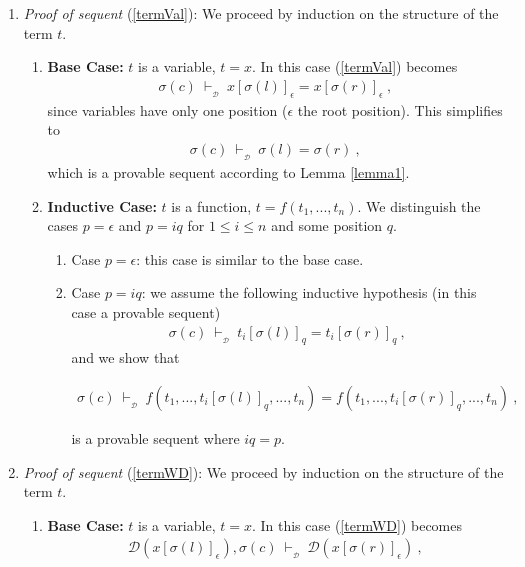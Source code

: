 \documentclass[copyright]{eptcs}
\begin{document}
\begin{enumerate}
\item \textit{Proof of sequent} (\ref{termVal}): We proceed by induction on the structure of the term $t$.
\begin{enumerate}
\item \textbf{Base Case:} $t$ is a variable, $t = x$. In this case (\ref{termVal}) becomes
\begin{eqnarray*}
\sigma(c)~\vdash_{_\mathcal{D}}~x[\sigma(l)]_\epsilon = x[\sigma(r)]_\epsilon~,
\end{eqnarray*}
since variables have only one position ($\epsilon$ the root position). This simplifies to 
\begin{eqnarray*}
\sigma(c)~\vdash_{_\mathcal{D}}~\sigma(l) = \sigma(r)~,
\end{eqnarray*}
which is a provable sequent according to Lemma \ref{lemma1}.
\item \textbf{Inductive Case:} $t$ is a function, $t = f(t_1,...,t_n)$. We distinguish the cases $p=\epsilon$ and $p=iq$ for $1\leq i\leq n$ and some position $q$.
\begin{enumerate}
\item Case $p=\epsilon$: this case is similar to the base case.
\item Case $p=iq$: we assume the following inductive hypothesis (in this case a provable sequent)
\begin{eqnarray*}
\sigma(c)~\vdash_{_\mathcal{D}}~t_i[\sigma(l)]_q = t_i[\sigma(r)]_q~,
\end{eqnarray*}
and we show that
\begin{small}
\begin{eqnarray*}
\sigma(c)~\vdash_{_\mathcal{D}}~f(t_1,...,t_i[\sigma(l)]_q,...,t_n) = f(t_1,...,t_i[\sigma(r)]_q,...,t_n)~,
\end{eqnarray*}
\end{small}
is a provable sequent where $iq=p$.
\end{enumerate}
\end{enumerate}
\item \textit{Proof of sequent} (\ref{termWD}): We proceed by induction on the structure of the term $t$.
\begin{enumerate}
\item \textbf{Base Case:} $t$ is a variable, $t = x$. In this case (\ref{termWD}) becomes
\begin{eqnarray*}
\mathcal{D}(x[\sigma(l)]_\epsilon), \sigma(c)~\vdash_{_\mathcal{D}}~\mathcal{D}( x[\sigma(r)]_\epsilon)~,
\end{eqnarray*}

\end{enumerate}
\end{enumerate}
\end{document}
